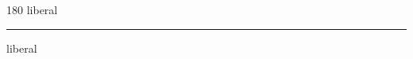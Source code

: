 
\begin{frame}
\begin{center}
\begin{turn}{180}
{\fontsize{2.5cm}{1em}\selectfont liberal}
\end{turn}
\vspace{1em}\par  
\hrule
\vspace{1em}\par  
{\fontsize{2.5cm}{1em}\selectfont liberal}
\end{center}
\end{frame}
